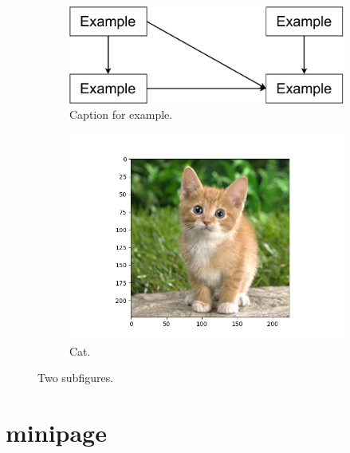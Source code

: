 \documentclass[12pt, a4paper]{article}
\begin{document}
\begin{figure}[hbt]
    \centering
    \begin{subfigure}[b]{0.48\textwidth}
        \centering
        \includegraphics[width=\linewidth]{figures/paper-example.pdf}
        \captionsetup{width=.9\linewidth}
        \caption{Caption for example.}\label{fig:example2}
    \end{subfigure}
    \begin{subfigure}[b]{0.44\textwidth}
        \centering
        \includegraphics[width=\linewidth]{figures/cat.png}
        \captionsetup{width=.9\linewidth}
        \caption{\tiny Cat.}\label{fig:cat}
    \end{subfigure}
    \caption{Two subfigures.} \label{fig:all}
\end{figure}

\section{minipage}
\end{document}
